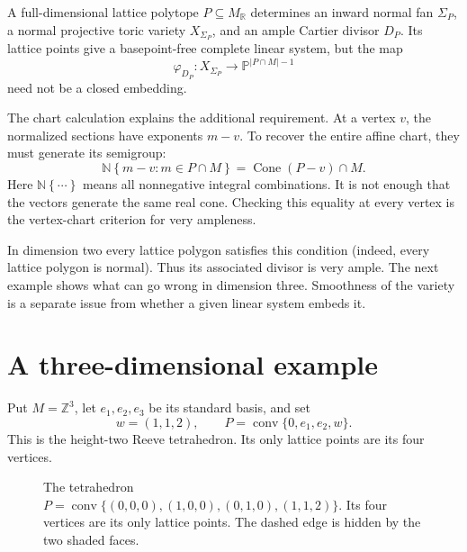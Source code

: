 \documentclass[11pt]{article}
\theoremstyle{definition}
\theoremstyle{remark}
\DeclareMathOperator{\Conv}{conv}
\DeclareMathOperator{\Cone}{Cone}
\newcommand{\set}[1]{\left\{#1\right\}}
\newcommand{\bP}{\mathbb{P}}
\newcommand{\bR}{\mathbb{R}}
\newcommand{\bN}{\mathbb{N}}
\newcommand{\bZ}{\mathbb{Z}}
\newcommand{\vf}{\varphi}
\begin{document}
A full-dimensional lattice polytope \(P\subseteq M_\bR\) determines
an inward normal fan \(\Sigma_P\), a normal projective toric variety
\(X_{\Sigma_P}\), and an ample Cartier divisor \(D_P\). Its lattice
points give a basepoint-free complete linear system, but the map
\[
    \vf_{D_P}:X_{\Sigma_P}\longrightarrow
       \bP^{|P\cap M|-1}
\]
need not be a closed embedding.

The chart calculation explains the additional requirement. At a vertex
\(v\), the normalized sections have exponents \(m-v\). To recover the
entire affine chart, they must generate its semigroup:
\[
    \bN\set{m-v:m\in P\cap M}
       =\Cone(P-v)\cap M.
\]
Here \(\bN\set{\cdots}\) means all nonnegative integral combinations.
It is not enough that the vectors generate the same real cone.
Checking this equality at every vertex is the vertex-chart criterion
for very ampleness.

In dimension two every lattice polygon satisfies this condition
(indeed, every lattice polygon is normal). Thus its associated divisor
is very ample. The next example shows what can go wrong in dimension
three. Smoothness of the variety is a separate issue from whether a
given linear system embeds it.

\section{A three-dimensional example}

Put \(M=\bZ^3\), let \(e_1,e_2,e_3\) be its standard basis, and set
\[
    w=(1,1,2),\qquad
    P=\Conv\{0,e_1,e_2,w\}.
\]
This is the height-two Reeve tetrahedron. Its only lattice points
are its four vertices.

\begin{figure}[htbp]
    \centering
    \caption{The tetrahedron
    \(P=\operatorname{conv}\{(0,0,0),(1,0,0),(0,1,0),(1,1,2)\}\).
    Its four vertices are its only lattice points. The dashed edge is hidden
    by the two shaded faces.}
    \label{fig:oct19-diagram5}
\end{figure}
\end{document}
